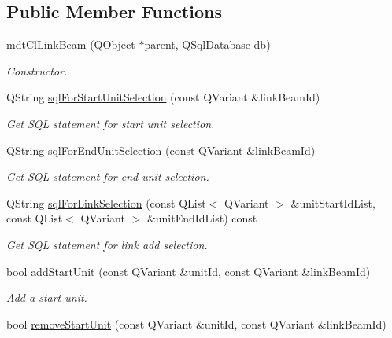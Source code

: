 \subsection*{Public Member Functions}
\begin{DoxyCompactItemize}
\item 
\hyperlink{classmdt_cl_link_beam_a3b020f3fc214ebe0fc84eacc10ebfd14}{mdt\-Cl\-Link\-Beam} (\hyperlink{class_q_object}{Q\-Object} $\ast$parent, Q\-Sql\-Database db)
\begin{DoxyCompactList}\small\item\em Constructor. \end{DoxyCompactList}\item 
Q\-String \hyperlink{classmdt_cl_link_beam_a859cda2a2dbcfc549d1cc2f24e5ea100}{sql\-For\-Start\-Unit\-Selection} (const Q\-Variant \&link\-Beam\-Id)
\begin{DoxyCompactList}\small\item\em Get S\-Q\-L statement for start unit selection. \end{DoxyCompactList}\item 
Q\-String \hyperlink{classmdt_cl_link_beam_a0f6d6be2bbb6a98eb4337b48fc300e28}{sql\-For\-End\-Unit\-Selection} (const Q\-Variant \&link\-Beam\-Id)
\begin{DoxyCompactList}\small\item\em Get S\-Q\-L statement for end unit selection. \end{DoxyCompactList}\item 
Q\-String \hyperlink{classmdt_cl_link_beam_ac072ca5510cfcb6572903c45f4fd817a}{sql\-For\-Link\-Selection} (const Q\-List$<$ Q\-Variant $>$ \&unit\-Start\-Id\-List, const Q\-List$<$ Q\-Variant $>$ \&unit\-End\-Id\-List) const 
\begin{DoxyCompactList}\small\item\em Get S\-Q\-L statement for link add selection. \end{DoxyCompactList}\item 
bool \hyperlink{classmdt_cl_link_beam_a8e4cfac27799db782d4739398fdac88f}{add\-Start\-Unit} (const Q\-Variant \&unit\-Id, const Q\-Variant \&link\-Beam\-Id)
\begin{DoxyCompactList}\small\item\em Add a start unit. \end{DoxyCompactList}\item 
bool \hyperlink{classmdt_cl_link_beam_a47c8665ff96aa94fe57452d9bb178700}{remove\-Start\-Unit} (const Q\-Variant \&unit\-Id, const Q\-Variant \&link\-Beam\-Id)

\end{DoxyCompactItemize}

